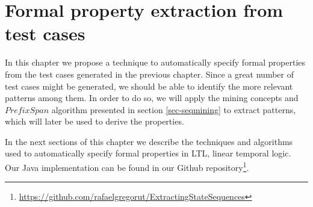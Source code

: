 \chapter{Formal property extraction from test cases}
\label{cap:propextract}

In this chapter we propose a technique to automatically specify formal properties from the test cases generated in the previous chapter. Since a great number of test cases might be generated, we should be able to identify the more relevant patterns among them. In order to do so, we will apply the mining concepts and $PrefixSpan$ algorithm presented in section \ref{sec-seqmining} to extract patterns, which will later be used to derive the properties.

In the next sections of this chapter we describe the techniques and algorithms used to automatically specify formal properties in LTL, linear temporal logic. Our Java implementation can be found in our Github repository\footnote{\url{https://github.com/rafaelgregorut/ExtractingStateSequences}}.



%


%









